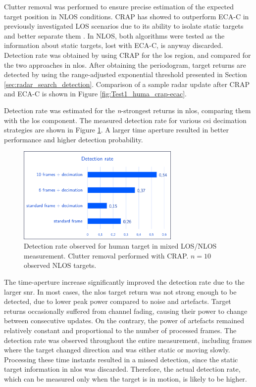 Clutter removal was performed to ensure precise estimation of the expected target position in NLOS conditions. 
CRAP has showed to outperform ECA-C in previously investigated LOS scenarios due to its ability to isolate static targets and better separate them \cite{Henninger_CRAP_2023}.
In NLOS, both algorithms were tested as the information about static targets, lost with ECA-C, is anyway discarded.
Detection rate was obtained by using CRAP for the \gls{los} region, and compared for the two approaches in \gls{nlos}.
After obtaining the periodogram, target returns are detected by using the range-adjusted exponential threshold presented in Section \ref{sec:radar_search_detection}.
Comparison of a sample radar update after CRAP and ECA-C is shown in Figure \ref{fig:Test1_huma_crap-ecac}.






Detection rate was estimated for the \textit{n}-strongest returns in \gls{nlos}, comparing them with the \gls{los} component.
The measured detection rate for various \gls{csi} decimation strategies are shown in Figure \ref{fig:Test1_detect_hist}. A larger time aperture resulted in better performance and higher detection probability.

\begin{figure}[H]
	\centering
	\includegraphics[width=0.7\textwidth]{Images/Test1/detect_hist/detect_hist_human_LMsans.png}
	\caption{Detection rate observed for human target in mixed LOS/NLOS measurement. Clutter removal performed with CRAP. $n=10$ observed NLOS targets.}
	\label{fig:Test1_detect_hist}
\end{figure}

The time-aperture increase significantly improved the detection rate due to the larger \gls{snr}.
In most cases, the \gls{nlos} target return was not strong enough to be detected, due to lower peak power compared to noise and artefacts.
Target returns occasionally suffered from channel fading, causing their power to change between consecutive updates. On the contrary, the power of artefacts remained relatively constant and proportional to the number of processed frames.
The detection rate was observed throughout the entire measurement, including frames where the target changed direction and was either static or moving slowly. Processing these time instants resulted in a missed detection, since the static target information in \gls{nlos} was discarded. 
Therefore, the actual detection rate, which can be measured only when the target is in motion, is likely to be higher.

